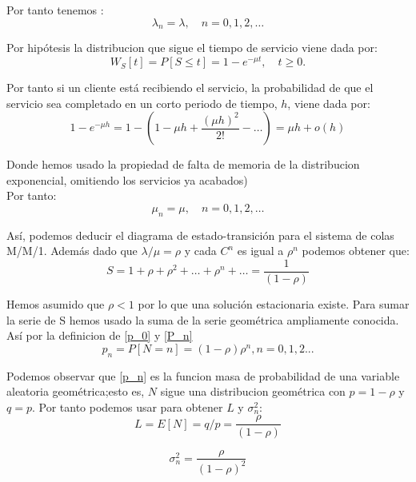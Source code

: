 \documentclass[a4paper,10pt]{scrartcl}
\theoremstyle{definition}
\numberwithin{equation}{section}
\begin{document}
Por tanto tenemos :
\begin{equation*}
  \lambda_n=\lambda, \quad n=0,1,2,\dots
\end{equation*}

Por hipótesis la distribucion que sigue el tiempo de servicio viene dada por:
\begin{equation*}
  W_S[t] = P[S\leq t] = 1-e^{-\mu t}, \quad t\ge 0.
\end{equation*}

Por tanto si un cliente está recibiendo el servicio, la probabilidad de que el servicio sea completado en un corto periodo de tiempo, $h$, viene dada por:
\begin{equation*}
1-e^{-\mu h} = 1 - \left(1-\mu h+\frac{(\mu h)^2}{2!}- \dots\right)=\mu h +o(h)
\end{equation*}

Donde hemos usado la propiedad de falta de memoria de la distribucion exponencial, omitiendo los servicios ya acabados)\\
Por tanto:
\begin{equation*}
\mu_n=\mu, \quad n=0,1,2,\dots
\end{equation*}

Así, podemos deducir el diagrama de estado-transición para el sistema de colas M/M/1. Además dado que $\lambda/\mu=\rho$ y cada $C^n$ es igual a $\rho^n$ podemos obtener que:
\begin{equation*}
S=1+\rho+\rho^2+\dots+\rho^n+\dots=\frac{1}{(1-\rho)}
\end{equation*}

Hemos asumido que $\rho<1$ por lo que una solución estacionaria existe.
Para sumar la serie de S hemos usado la suma de la serie geométrica ampliamente conocida.
Así por la definicion de \ref{p_0} y \ref{P_n}
\begin{equation}
  p_n=P[N=n]=(1-\rho)\rho^n, n=0,1,2...
\label{eq:p_n}
\end{equation}

Podemos observar que \ref{p_n} es la funcion masa de probabilidad de una variable aleatoria geométrica;esto
es, $N$ sigue una distribucion geométrica con $p=1-\rho$ y $q=p$. Por tanto podemos usar para obtener $L$ 
y $\sigma_n^2$:
\begin{equation*}
  L=E[N]=q/p=\frac{\rho}{(1-\rho)}
\end{equation*}

\begin{equation*}
  \sigma_n^2=\frac{\rho}{(1-\rho)^2}
\end{equation*}
\end{document}
